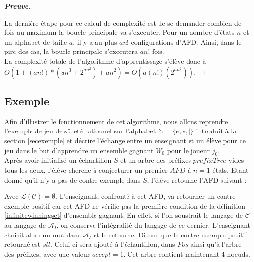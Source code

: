 \documentclass[12pt,a4paper,oneside,titlepage]{report}
\newenvironment{demonstration}{\begin{proof}[\textnormal{\textbf{Preuve.}}]}{\end{proof}}
\begin{document}
\begin{demonstration}
\begin{itemize}
\end{itemize}
La dernière étape pour ce calcul de complexité est de se demander combien de fois au maximum la boucle principale va s'executer. Pour un nombre d'états $n$ et un alphabet de taille $a$, il y a au plus $an!$ configurations d'AFD. Ainsi, dans le pire des cas, la boucle principale s'executera $an!$ fois. \\
La complexité totale de l'algorithme d'apprentissage s'élève donc à $O(1+(an!)*(an^3+2^{an^2})+an^2)=O(a(n!)(2^{an^2}))$.
\end{demonstration}
\subsection{Exemple}
Afin d'illustrer le fonctionnement de cet algorithme, nous allons reprendre l'exemple de jeu de sûreté rationnel sur l'alphabet $\Sigma=\{e,s,|\}$ introduit à la section \ref{secexemple} et décrire l'échange entre un enseignant et un élève pour ce jeu dans le but d'apprendre un ensemble gagnant $W_0$ pour le joueur $j_0$.\\

Après avoir initialisé un échantillon $S$ et un arbre des préfixes $prefixTree$ vides tous les deux, l'élève cherche à conjecturer un premier $AFD$ à $n=1$ états. Etant donné qu'il n'y a pas de contre-exemple dans $S$, l'élève retourne l'AFD suivant :

\begin{figure}[H]
\centering
{}
\end{figure}
\noindent Avec $\mathcal{L}(\mathcal{C})=\emptyset$. L'enseignant, confronté à cet AFD, va retourner un contre-exemple positif car cet AFD ne vérifie pas la première condition de la définition \ref{infinitewinningset} d'ensemble gagnant. En effet, si l'on soustrait le langage de $\mathcal{C}$ au langage de $\mathcal{A}_I$, on conserve l'intégralité du langage de ce dernier. L'enseignant choisit alors un mot dans $\mathcal{A}_I$ et le retourne. Disons que le contre-exemple positif retourné est $sll$. Celui-ci sera ajouté à l'échantillon, dans $Pos$ ainsi qu'à l'arbre des préfixes, avec une valeur $accept=1$. Cet arbre contient maintenant 4 noeuds.\\
\end{document}
